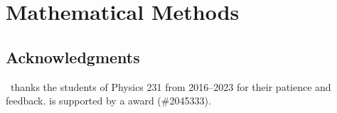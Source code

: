 \documentclass[12pt]{report}    %
\begin{document}
\chapter{Mathematical Methods}




% 
% 
% 
% 



\section*{Acknowledgments}

\ thanks 
the students of Physics 231 from 2016--2023
for their patience and feedback.
%
%
 is supported by a  award (\#2045333).







\printindex
\end{document}
